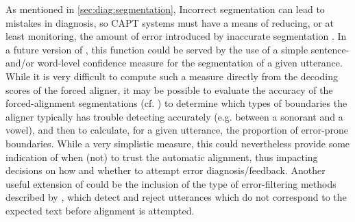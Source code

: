 	
	
	As mentioned in \cref{sec:diag:segmentation}, 
	Incorrect segmentation can lead to mistakes in diagnosis, so CAPT systems must have a means of reducing, or at least monitoring, the amount of error introduced by inaccurate segmentation \citep{Eskenazi2009}. 
	In a future version of , this function could be served by the use of a simple sentence- and/or word-level confidence measure for the segmentation of a given utterance. 
	While it is very difficult to compute such a measure directly from the decoding scores of the forced aligner, it may be possible to evaluate the accuracy of the forced-alignment segmentations (cf. \cite{Mesbahi2011}) to determine 
	which types of boundaries the aligner typically has trouble detecting accurately (e.g. between a sonorant and a vowel), and then to calculate, for a given utterance, the proportion of error-prone boundaries. While a very simplistic measure, this could nevertheless provide some indication of when (not) to trust the automatic alignment, thus impacting decisions on how and whether to attempt error diagnosis/feedback.
	Another useful extension of  could be the inclusion of the type of error-filtering methods described by \textcite{Bonneau2012,Orosanu2012}, which detect and reject utterances which do not correspond to the expected text before alignment is attempted.
	
	
	
	
	
	
	
	
	

	
	
	
